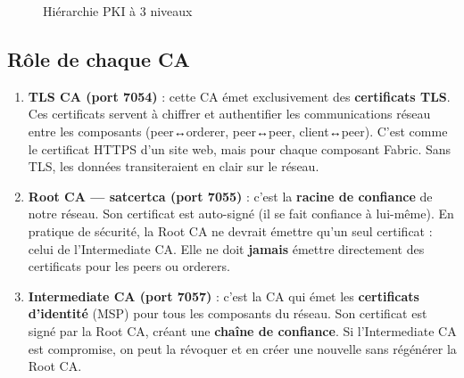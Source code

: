 \documentclass[12pt,a4paper,twoside]{report}
\begin{document}
\begin{figure}[H]
\centering
{}
\caption{Hiérarchie PKI à 3 niveaux}
\end{figure}

\subsection{Rôle de chaque CA}

\begin{enumerate}
    \item \textbf{TLS CA (port 7054)} : cette CA émet exclusivement des \textbf{certificats TLS}. Ces certificats servent à chiffrer et authentifier les communications réseau entre les composants (peer↔orderer, peer↔peer, client↔peer). C'est comme le certificat HTTPS d'un site web, mais pour chaque composant Fabric. Sans TLS, les données transiteraient en clair sur le réseau.
    
    \item \textbf{Root CA --- satcertca (port 7055)} : c'est la \textbf{racine de confiance} de notre réseau. Son certificat est auto-signé (il se fait confiance à lui-même). En pratique de sécurité, la Root CA ne devrait émettre qu'un seul certificat : celui de l'Intermediate CA. Elle ne doit \textbf{jamais} émettre directement des certificats pour les peers ou orderers.
    
    \item \textbf{Intermediate CA (port 7057)} : c'est la CA qui émet les \textbf{certificats d'identité} (MSP) pour tous les composants du réseau. Son certificat est signé par la Root CA, créant une \textbf{chaîne de confiance}. Si l'Intermediate CA est compromise, on peut la révoquer et en créer une nouvelle sans régénérer la Root CA.
\end{enumerate}
\end{document}

